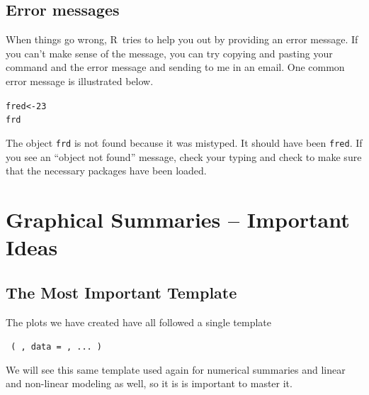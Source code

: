 \documentclass[twoside]{book}\usepackage[]{graphicx}\usepackage[]{xcolor}
\makeatletter
\newcommand{\hlnum}[1]{\textcolor[rgb]{0.686,0.059,0.569}{#1}}%
\newcommand{\hlstd}[1]{\textcolor[rgb]{0.345,0.345,0.345}{#1}}%
\newcommand{\hlkwb}[1]{\textcolor[rgb]{0.69,0.353,0.396}{#1}}%
\newenvironment{kframe}{%
 \def\at@end@of@kframe{}%
 \ifinner\ifhmode%
  \def\at@end@of@kframe{\end{minipage}}%
  \begin{minipage}{\columnwidth}%
 \fi\fi%
 \def\FrameCommand##1{\hskip\@totalleftmargin \hskip-\fboxsep
 \colorbox{shadecolor}{##1}\hskip-\fboxsep
     \hskip-\linewidth \hskip-\@totalleftmargin \hskip\columnwidth}%
 \MakeFramed {\advance\hsize-\width
   \@totalleftmargin\z@ \linewidth\hsize
   \@setminipage}}%
 {\par\unskip\endMakeFramed%
 \at@end@of@kframe}
\newenvironment{knitrout}{}{} %
\renewcommand{\code}[1]{{\color{blue!80!black}\texttt{#1}}}
\def\R{{\sf R}}
\makeatother
\begin{document}
\subsection{Error messages}
When things go wrong, \R\ tries to help you out by providing an error message.
If you can't make sense of the message, you can try copying and pasting your
command and the error message and sending to me in an email.  One common error
message is illustrated below.
\begin{knitrout}
\color{fgcolor}\begin{kframe}
\begin{alltt}
\hlstd{fred} \hlkwb{<-} \hlnum{23}
\hlstd{frd}
\end{alltt}


{\ttfamily\noindent\bfseries\color{errorcolor}{\#\# Error in eval(expr, envir, enclos): object 'frd' not found}}\end{kframe}
\end{knitrout}
The object \code{frd} is not found because it was mistyped.  It should have
been \code{fred}.  If you see an ``object not found'' message, check your
typing and check to make sure that the necessary packages have been loaded.

\section{Graphical Summaries -- Important Ideas}

\subsection{The Most Important Template}

The plots we have created have all followed a single template

\begin{center}
	\Large 
	\texttt{  ( , data = , ... ) }
\end{center}
We will see this same template used again for numerical summaries and linear and non-linear 
modeling as well, so it is is important to master it.
\end{document}

